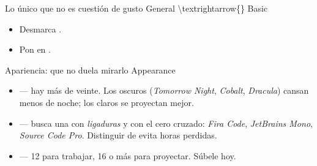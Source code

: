 \begin{frame}{Lo único que no es cuestión de gusto}
  \vspace{0.2em}
  \ac{General \textrightarrow{} Basic}

  \vspace{0.9em}
  \begin{itemize}\setlength{\itemsep}{0.8em}
    \item<1-> Desmarca .
    \item<2-> Pon  en .
  \end{itemize}

  \vspace{1.1em}
\end{frame}

\begin{frame}{Apariencia: que no duela mirarlo}
  \vspace{0.2em}
  \ac{Appearance}

  \vspace{0.9em}
  \begin{itemize}\setlength{\itemsep}{0.75em}
    \item<1->  — hay más de veinte. Los oscuros
          (\textit{Tomorrow Night}, \textit{Cobalt}, \textit{Dracula})
          cansan menos de noche; los claros se proyectan mejor.
    \item<2->  — busca una con \textit{ligaduras} y con el
          cero cruzado: \textit{Fira Code}, \textit{JetBrains Mono},
          \textit{Source Code Pro}. Distinguir  de  evita
          horas perdidas.
    \item<3->  — 12 para trabajar, 16 o más para
          proyectar. Súbele hoy.
  \end{itemize}
\end{frame}

